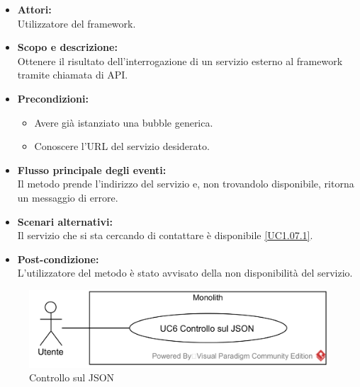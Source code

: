 \begin{itemize}
	\item \textbf{Attori:}
	\\Utilizzatore del framework.
	\item \textbf{Scopo e descrizione:} 
	\\Ottenere il risultato dell'interrogazione di un servizio esterno al framework tramite chiamata di API.
	\item \textbf{Precondizioni:}
	\begin{itemize}
		\item Avere già istanziato una bubble generica.
		\item Conoscere l'URL del servizio desiderato.
	\end{itemize}
	\item \textbf{Flusso principale degli eventi:}
	\\Il metodo prende l'indirizzo del servizio e, non trovandolo disponibile, ritorna un messaggio di errore.
	\item \textbf{Scenari alternativi:}
	\\Il servizio che si sta cercando di contattare è disponibile \ref{UC1.07.1}.
	\item \textbf{Post-condizione:}
	\\L'utilizzatore del metodo è stato avvisato della non disponibilità del servizio.
\end{itemize}


\begin{figure}[H]
	\centering
	\includegraphics[width=15cm]{../../documenti/AnalisiDeiRequisiti/Diagrammi_img/usecase/uc1_12.png}
	\caption{\UCCaption{} Controllo sul JSON}
\end{figure}

